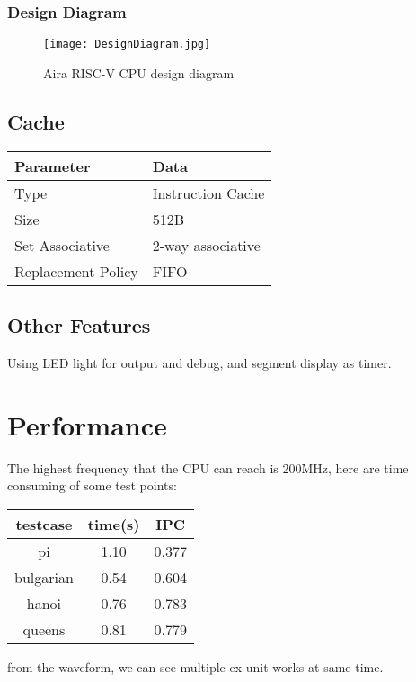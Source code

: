 \documentclass[UTF8]{ctexart}
\begin{document}
    \subsubsection{Design Diagram}

    \begin{figure}[h]
    \texttt{[image: DesignDiagram.jpg]}
    \caption{Aira RISC-V CPU design diagram}
    \end{figure}

    \subsection{Cache}
    \begin{center}
        \begin{tabular}{ll}
            \hline
            Parameter & Data\\
            \hline
            Type & Instruction Cache \\
            \hline
            Size & 512B              \\
            \hline
            Set Associative & 2-way associative \\
            \hline
            Replacement Policy & FIFO \\
            \hline
        \end{tabular}
    \end{center}
    \subsection{Other Features}
    Using LED light for output and debug, and segment display as timer.
\section{Performance}
    The highest frequency that the CPU can reach is 200MHz, here are time consuming of some test points:
    \begin{center}
        \begin{tabular}{ccc}
            \hline
            testcase & time(s) & IPC \\
            \hline
            pi & 1.10  & 0.377\\
            \hline
            bulgarian & 0.54  & 0.604\\
            \hline
            hanoi & 0.76  & 0.783\\
            \hline
            queens & 0.81  & 0.779\\
            \hline
        \end{tabular}
    \end{center}
    from the waveform, we can see multiple ex unit works at same time.
\end{document}
